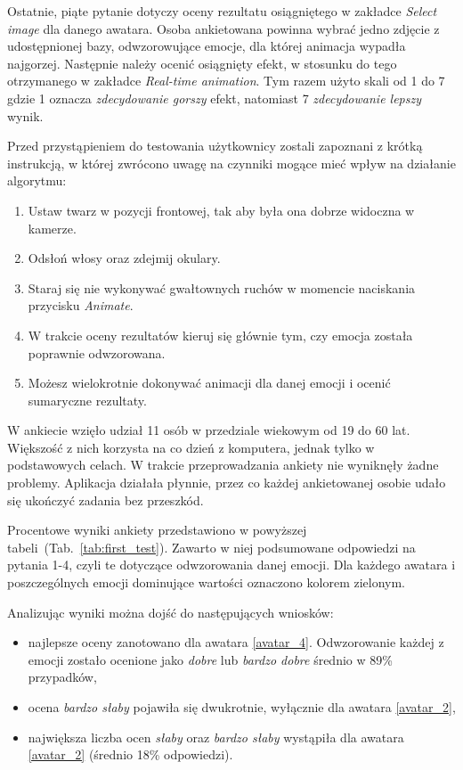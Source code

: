 Ostatnie, piąte pytanie dotyczy oceny rezultatu osiągniętego w zakładce \textit{Select image} dla danego awatara. Osoba ankietowana powinna wybrać jedno zdjęcie z udostępnionej bazy, odwzorowujące emocje, dla której animacja wypadła najgorzej. Następnie należy ocenić osiągnięty efekt, w stosunku do tego otrzymanego w zakładce \textit{Real-time animation}. Tym razem użyto skali od 1 do 7 gdzie 1 oznacza \textit{zdecydowanie gorszy} efekt, natomiast 7 \textit{zdecydowanie lepszy} wynik.

Przed przystąpieniem do testowania użytkownicy zostali zapoznani z krótką instrukcją, w której zwrócono uwagę na czynniki mogące mieć wpływ na działanie algorytmu:

\begin{enumerate}
    \item Ustaw twarz w pozycji frontowej, tak aby była ona dobrze widoczna w kamerze.
    \item Odsłoń włosy oraz zdejmij okulary.
    \item Staraj się nie wykonywać gwałtownych ruchów w momencie naciskania przycisku \textit{Animate}.
    \item W trakcie oceny rezultatów kieruj się głównie tym, czy emocja została poprawnie odwzorowana.
    \item Możesz wielokrotnie dokonywać animacji dla danej emocji i ocenić sumaryczne rezultaty.
\end{enumerate}

W ankiecie wzięło udział 11 osób w przedziale wiekowym od 19 do 60 lat. Większość z nich korzysta na co dzień z komputera, jednak tylko w podstawowych celach. W trakcie przeprowadzania ankiety nie wyniknęły żadne problemy. Aplikacja działała płynnie, przez co każdej ankietowanej osobie udało się ukończyć zadania bez przeszkód.

Procentowe wyniki ankiety przedstawiono w powyższej tabeli~(Tab.~\ref{tab:first_test}). Zawarto w niej podsumowane odpowiedzi na pytania 1-4, czyli te dotyczące odwzorowania danej emocji. Dla każdego awatara i poszczególnych emocji dominujące wartości oznaczono kolorem zielonym. 

Analizując wyniki można dojść do następujących wniosków:
\begin{itemize}
    \item najlepsze oceny zanotowano dla awatara \ref{avatar_4}. Odwzorowanie każdej z emocji zostało ocenione jako \textit{dobre} lub \textit{bardzo dobre} średnio w 89\% przypadków,
    \item ocena \textit{bardzo słaby} pojawiła się dwukrotnie, wyłącznie dla awatara \ref{avatar_2},
    \item największa liczba ocen \textit{słaby} oraz \textit{bardzo słaby} wystąpiła dla awatara \ref{avatar_2} (średnio 18\% odpowiedzi).
\end{itemize}

